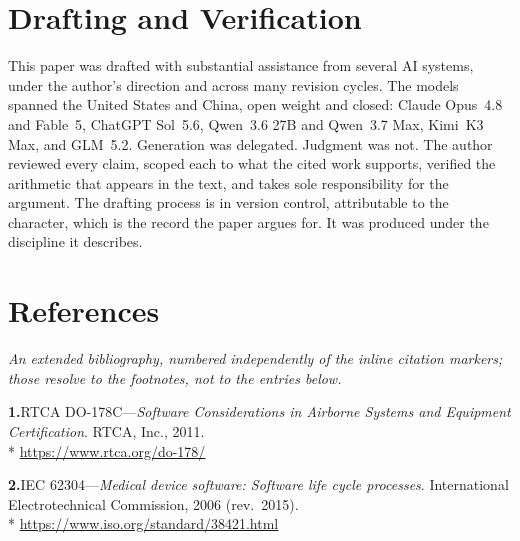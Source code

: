 \documentclass[11pt, a4paper]{article}
\begin{document}
\newpage
\section*{Drafting and Verification}

\noindent This paper was drafted with substantial assistance from several AI systems, under
the author's direction and across many revision cycles. The models spanned the United States
and China, open weight and closed: Claude Opus~4.8 and Fable~5, ChatGPT Sol~5.6, Qwen~3.6 27B
and Qwen~3.7 Max, Kimi~K3 Max, and GLM~5.2. Generation was delegated. Judgment was not. The
author reviewed every claim, scoped each to what the cited work supports, verified the
arithmetic that appears in the text, and takes sole responsibility for the argument. The
drafting process is in version control, attributable to the character, which is the record
the paper argues for. It was produced under the discipline it describes.


\newpage
\section*{References}

\footnotesize
\sloppy
\setlength{\parskip}{3pt plus 1.5pt minus 0.5pt}
\relax

\noindent\textit{An extended bibliography, numbered independently of the inline citation
markers; those resolve to the footnotes, not to the entries below.}

\smallskip

\noindent\textbf{1.}\enspace RTCA DO-178C---\textit{Software Considerations in Airborne
Systems and Equipment Certification}. RTCA, Inc., 2011.\\*
{\fontsize{8}{10}\selectfont\color{midb}
\href{https://www.rtca.org/do-178/}{https://www.rtca.org/do-178/}}


\noindent\textbf{2.}\enspace IEC 62304---\textit{Medical device software: Software life
cycle processes}. International Electrotechnical Commission, 2006 (rev.\ 2015).\\*
{\fontsize{8}{10}\selectfont\color{midb}
\href{https://www.iso.org/standard/38421.html}{https://www.iso.org/standard/38421.html}}
\end{document}
